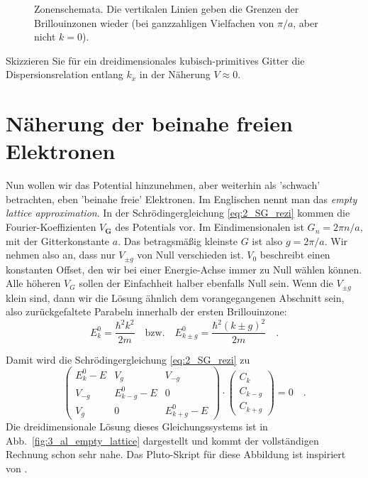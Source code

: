 \begin{figure}
   \caption{Zonenschemata. Die vertikalen Linien geben die Grenzen der Brillouinzonen wieder (bei ganzzahligen Vielfachen von $\pi/a$, aber nicht $k=0$). \label{fig:3_zone_scheme}}
\end{figure}

\begin{questions}
    \item Skizzieren Sie für ein dreidimensionales kubisch-primitives Gitter die Dispersionsrelation entlang $k_x$ in der Näherung $V \approx 0$.
\end{questions}



\section{Näherung der beinahe freien Elektronen}



Nun wollen wir das Potential hinzunehmen, aber weiterhin als 'schwach' betrachten, eben 'beinahe freie' Elektronen. Im Englischen  nennt man das \emph{empty lattice approximation}. In der Schrödingergleichung \ref{eq:2_SG_rezi} kommen die Fourier-Koeffizienten $V_\mathbf{G}$ des Potentials vor. Im Eindimensionalen ist $G_n = 2 \pi n / a$, mit der Gitterkonstante $a$. Das betragsmäßig kleinste $G$ ist also $g = 2 \pi / a$. Wir nehmen also an, dass nur $V_{\pm g}$ von Null verschieden ist. $V_0$ beschreibt einen konstanten Offset, den wir bei einer Energie-Achse immer zu Null wählen können. Alle höheren $V_G$ sollen der Einfachheit halber ebenfalls Null sein.  Wenn die $V_{\pm g}$ klein sind, dann wir die Lösung ähnlich dem vorangegangenen Abschnitt sein, also zurückgefaltete Parabeln innerhalb der ersten Brillouinzone:
\begin{equation}
    E_k^0 =  \frac{\hbar^2 k^2}{2m} \quad \text{bzw.} \quad    E_{k \pm g}^0 =  \frac{\hbar^2 (k  \pm g)^2}{2m}  \quad .
\end{equation}

Damit wird die Schrödingergleichung \ref{eq:2_SG_rezi} zu
\begin{equation}
   \begin{pmatrix}
    E_k^0 - E &  V_{g} &  V_{-g} \\
    V_{-g}  &   E_{k - g}^0 - E & 0  \\
    V_{g}  &  0 &     E_{k + g}^0 - E  
\end{pmatrix}
  \cdot
  \begin{pmatrix}
    C_{k} \\  C_{k - g} \\  C_{k + g}
  \end{pmatrix}
 = 0  \quad . 
 \label{eq:2_SG_empty_lattice} 
\end{equation}
Die dreidimensionale Lösung dieses Gleichungssystems ist in Abb.~\ref{fig:3_al_empty_lattice} dargestellt und kommt der vollständigen Rechnung schon sehr nahe. Das Pluto-Skript für diese Abbildung ist inspiriert von \cite{Polakovic_cmpm3}.

